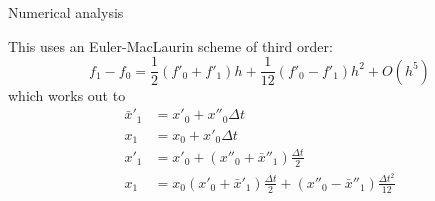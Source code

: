  {Numerical analysis}

This uses an Euler-MacLaurin scheme of third order:
\begin{equation}
  f_1-f_0 = \frac{1}{2} (f'_0+f'_1)h + \frac{1}{12}(f'_0-f'_1)h^2 + O(h^5)
\end{equation}
which works out to
\begin{equation}
  \begin{array}{ll}
    \bar x'_1 &= x'_0+x''_0\Delta t\\
    x_1       &= x_0+x'_0\Delta t\\
    x'_1      &= x'_0 + (x''_0+\bar x''_1) \frac{\Delta t}{2}\\
    x_1       & = x_0 ( x'_0 + \bar x'_1 ) \frac{\Delta t}{2} +
                  (x''_0-\bar x''_1) \frac{\Delta t^2}{12}\\
  \end{array}
\end{equation}
